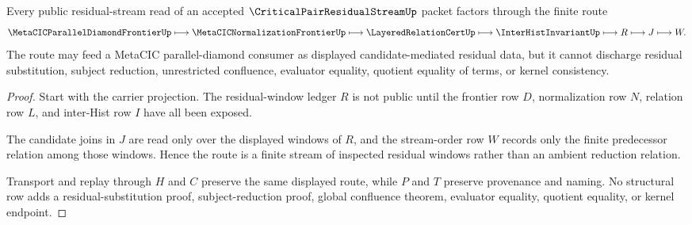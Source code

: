 \begin{theorem}
\label{thm:critical-pair-residual-stream-route}
Every public residual-stream read of an accepted $\CriticalPairResidualStreamUp$ packet factors through the finite route
$$
\MetaCICParallelDiamondFrontierUp \longmapsto
\MetaCICNormalizationFrontierUp \longmapsto
\LayeredRelationCertUp \longmapsto
\InterHistInvariantUp \longmapsto R \longmapsto J \longmapsto W .
$$
The route may feed a MetaCIC parallel-diamond consumer as displayed candidate-mediated residual data, but it cannot discharge residual substitution, subject reduction, unrestricted confluence, evaluator equality, quotient equality of terms, or kernel consistency.
\end{theorem}
\begin{proof}
Start with the carrier projection. The residual-window ledger $R$ is not public until the frontier row $D$, normalization row $N$, relation row $L$, and inter-Hist row $I$ have all been exposed.

The candidate joins in $J$ are read only over the displayed windows of $R$, and the stream-order row $W$ records only the finite predecessor relation among those windows. Hence the route is a finite stream of inspected residual windows rather than an ambient reduction relation.

Transport and replay through $H$ and $C$ preserve the same displayed route, while $P$ and $T$ preserve provenance and naming. No structural row adds a residual-substitution proof, subject-reduction proof, global confluence theorem, evaluator equality, quotient equality, or kernel endpoint.
\end{proof}

